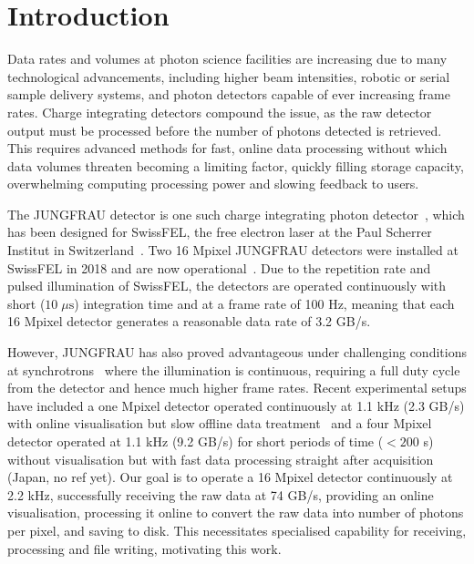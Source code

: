 \documentclass[a4paper]{article}
\begin{document}
\section{Introduction}

Data rates and volumes at photon science facilities are increasing due to many technological advancements, including higher beam intensities, robotic or serial sample delivery systems, and photon detectors capable of ever increasing frame rates. Charge integrating detectors compound the issue, as the raw detector output must be processed before the number of photons detected is retrieved. This requires advanced methods for fast, online data processing without which data volumes threaten becoming a limiting factor, quickly filling storage capacity, overwhelming computing processing power and slowing feedback to users.

The JUNGFRAU detector is one such charge integrating photon detector~\cite{Mozzanica_2016}, which has been designed for SwissFEL, the free electron laser at the Paul Scherrer Institut in Switzerland~\cite{SwissFEL}. Two 16 Mpixel JUNGFRAU detectors were installed at SwissFEL in 2018 and are now operational~\cite{JFapplications}. Due to the repetition rate and pulsed illumination of SwissFEL, the detectors are operated continuously with short ($10\;\mu\mathrm{s}$) integration time and at a frame rate of 100 Hz, meaning that each 16 Mpixel detector generates a reasonable data rate of 3.2 GB/s. 

However, JUNGFRAU has also proved advantageous under challenging conditions at synchrotrons~\cite{Leonarski_2018} where the illumination is continuous, requiring a full duty cycle from the detector and hence much higher frame rates. Recent experimental setups have included a one Mpixel detector operated continuously at 1.1 kHz (2.3 GB/s) with online visualisation but slow offline data treatment~\cite{Leonarski_2018} and a four Mpixel detector operated at 1.1 kHz (9.2 GB/s) for short periods of time ($<200$ s) without visualisation but with fast data processing straight after acquisition (Japan, no ref yet). Our goal is to operate a 16 Mpixel detector continuously at 2.2 kHz, successfully receiving the raw data at 74 GB/s, providing an online visualisation, processing it online to convert the raw data into number of photons per pixel, and saving to disk. This necessitates specialised capability for receiving, processing and file writing, motivating this work.
\end{document}
